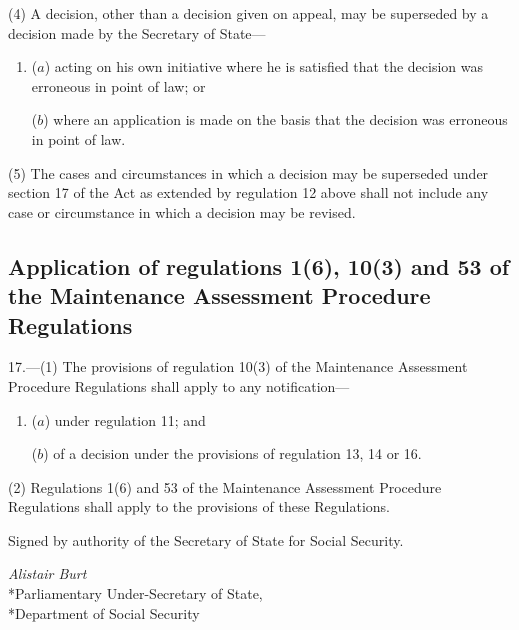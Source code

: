 \documentclass[12pt,a4paper]{article}
\begin{document}
(4) A decision, other than a decision given on appeal, may be superseded by a decision made by the Secretary of State—
\begin{enumerate}\item[]
($a$) acting on his own initiative where he is satisfied that the decision was erroneous in point of law; or

($b$) where an application is made on the basis that the decision was erroneous in point of law.
\end{enumerate}

(5) The cases and circumstances in which a decision may be superseded under section 17 of the Act as extended by regulation 12 above shall not include any case or circumstance in which a decision may be revised.


\subsection[17. Application of regulations 1(6), 10(3) and 53 of the Maintenance Assessment Procedure Regulations]{Application of regulations 1(6), 10(3) and 53 of the Maintenance Assessment Procedure Regulations}

17.—(1) The provisions of regulation 10(3) of the Maintenance Assessment Procedure Regulations shall apply to any notification—
\begin{enumerate}\item[]
($a$) under regulation 11; and

($b$) of a decision under the provisions of regulation 13, 14 or 16.
\end{enumerate}

(2) Regulations 1(6) and 53 of the Maintenance Assessment Procedure Regulations shall apply to the provisions of these Regulations.


\bigskip

Signed by authority of the Secretary of State for Social Security.

{\raggedleft
\emph{Alistair Burt}\\*Parliamentary Under-Secretary of State,\\*Department of Social Security

}
\end{document}
